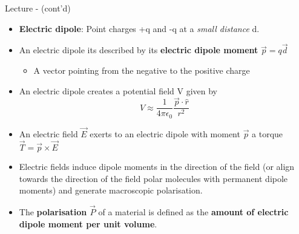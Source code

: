 \begin{frame}{Lecture \summarizedlecture - \lecturesummarytitle (cont'd)}

\begin{itemize}

   \item  {\bf Electric dipole}:
          Point charges +q and -q at a {\em small distance} d.\\

          \vspace{0.1cm}

   \item  An electric dipole its described by its {\bf electric dipole moment} $\vec{p} = q \vec{d}$\\
          \begin{itemize}
                 \item A vector pointing from the negative to the positive charge
           \end{itemize}

          \vspace{0.1cm}

   \item  An electric dipole creates a potential field V given by
          \begin{equation*}
            V \approx \frac{1}{4\pi\epsilon_0} \frac{\vec{p} \cdot \hat{r}}{r^2}
          \end{equation*}

   \item  An electric field $\vec{E}$ exerts to an electric dipole with moment $\vec{p}$
          a torque $\vec{T} = \vec{p} \times \vec{E}$

          \vspace{0.1cm}

   \item  Electric fields induce dipole moments in the direction of the field (or align
              towards the direction of the field polar molecules with permanent dipole moments)
              and generate macroscopic polarisation.

          \vspace{0.1cm}

   \item  The {\bf polarisation} $\vec{P}$ of a material is defined as the
          {\bf amount of electric dipole moment per unit volume}.\\

\end{itemize}

\end{frame}


